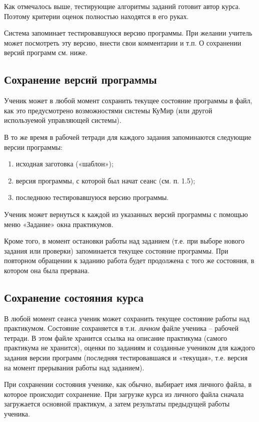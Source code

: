 	Как отмечалось выше, тестирующие алгоритмы заданий готовит автор курса. Поэтому критерии оценок полностью находятся в его руках.
	
	Система запоминает тестировавшуюся версию программы. При желании учитель может посмотреть эту версию, внести свои комментарии и т.п. О сохранении версий программ см. ниже. 


\subsection {Сохранение версий программы}
Ученик может в любой момент сохранить текущее состояние программы в файл, как это предусмотрено возможностями системы КуМир (или другой используемой управляющей системы). 
	
	В то же время в рабочей тетради для каждого задания запоминаются следующие версии программы:
	\begin{enumerate}
	\item исходная заготовка («шаблон»);
	\item версия программы,  с которой был начат сеанс (см. п. 1.5);
	\item последнюю тестировавшуюся версию программы.
\end{enumerate}
	Ученик может вернуться к каждой из указанных версий программы с помощью меню «Задание» окна практикумов. 
	
	Кроме того, в момент остановки работы над заданием (т.е. при выборе нового задания или проверки) запоминается текущее состояние программы. При повторном обращении к заданию работа будет продолжена с того же состояния, в котором она была прервана. 


\subsection {Сохранение состояния курса}
	В любой момент сеанса ученик может сохранить текущее состояние работы над практикумом. Состояние сохраняется в т.н. \emph{личном} файле ученика – рабочей тетради. 
	В этом файле хранится ссылка на описание практикума (самого практикума не хранится), оценки по заданиям и созданные учеником для каждого задания версии программ (последняя тестировавшаяся и «текущая», т.е. версия на момент прерывания работы над заданием). 
	
	При сохранении состояния ученике, как обычно, выбирает имя личного файла, в которое происходит сохранение. При загрузке курса из личного файла  сначала загружается основной практикум, а затем результаты предыдущей работы ученика. 



